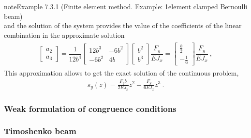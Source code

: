 \documentclass[letterpaper,10pt,english]{jupyterBook}
\begin{document}
\begin{sphinxadmonition}{note}{Example 7.3.1 (Finite element method. Example: 1\sphinxhyphen{}element clamped Bernoulli beam)}
\begin{equation*}
\end{equation*}
\sphinxAtStartPar
and the solution of the system provides the value of the coefficients of the linear combination in the approximate solution
\begin{equation*}
\begin{split}\begin{aligned}
 \begin{bmatrix} a_2 \\ a_3 \end{bmatrix} = \dfrac{1}{12 b^4} \begin{bmatrix} 12 b^3 & - 6 b^2 \\ - 6 b^2 & 4 b \end{bmatrix} \begin{bmatrix} b^2 \\ b^3 \end{bmatrix} \dfrac{F_y}{E J_x} = \begin{bmatrix} \frac{b}{2} \\ -\frac{1}{6} \end{bmatrix} \dfrac{F_y}{EJ_x} \ ,
\end{aligned}\end{split}
\end{equation*}
\sphinxAtStartPar
This approximation allows to get the exact solution of the continuous problem,
\begin{equation*}
\begin{split}s_y(z) = \frac{F_y b}{2 EJ_x} z^2 - \frac{F_y}{6 EJ_x} z^3 \ .\end{split}
\end{equation*}\end{sphinxadmonition}


\subsubsection{Weak formulation of congruence conditions}
\label{\detokenize{ch/solids/small-displacements-statics-beams-weak-form:weak-formulation-of-congruence-conditions}}\label{\detokenize{ch/solids/small-displacements-statics-beams-weak-form:solid-mechanics-intro-small-displacements-statics-beam-weak-form-weak-congruence}}\subsubsection*{Timoshenko beam}
\end{document}
